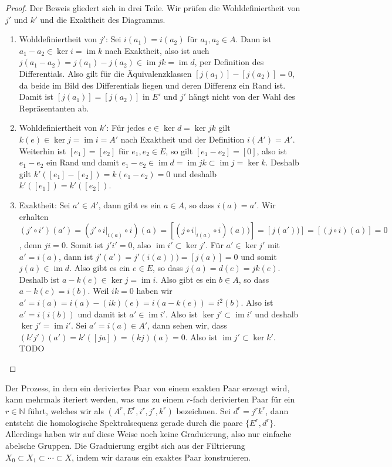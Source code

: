 \documentclass[12pt, hidelinks]{article}
\numberwithin{conj}{section}
\newcommand{\ima}{\operatorname{im}}
\begin{document}
\begin{proof}
    Der Beweis gliedert sich in drei Teile. Wir prüfen die Wohldefiniertheit von $j'$ und $k'$ und die Exaktheit des Diagramms.
    \begin{enumerate}[nolistsep]
        \item Wohldefiniertheit von $j'$: Sei $i(a_1) = i(a_2)$ für $a_1,a_2 \in A$. Dann ist $a_1-a_2 \in \ker i = \ima k$ nach Exaktheit, also ist auch $j(a_1-a_2) = j(a_1)-j(a_2) \in \ima jk = \ima d$, per Definition des Differentials. Also gilt für die Äquivalenzklassen $[j(a_1)]-[j(a_2)] = 0$, da beide im Bild des Differentials liegen und deren Differenz ein Rand ist. Damit ist $[j(a_1)] = [j(a_2)]$ in $E'$ und $j'$ hängt nicht von der Wahl des Repräsentanten ab.
        \item Wohldefiniertheit von $k'$: Für jedes $e \in \ker d = \ker jk$ gilt $k(e) \in \ker j = \ima i = A'$ nach Exaktheit und der Definition $i(A') = A'$. Weiterhin ist $[e_1] = [e_2]$ für $e_1,e_2 \in E$, so gilt $[e_1 - e_2] = [0]$, also ist $e_1-e_2$ ein Rand und damit $e_1 - e_2 \in \ima d = \ima jk \subset \ima j = \ker k$. Deshalb gilt $k'([e_1] - [e_2]) = k(e_1-e_2) = 0$ und deshalb $k'([e_1]) = k'([e_2])$.
        \item Exaktheit: Sei $a' \in A'$, dann gibt es ein $a \in A$, so dass $i(a) = a'$. Wir erhalten $(j'\circ i')(a') = (j'\circ i\vert_{i(a)} \circ i)(a) = [(j \circ i\vert_{i(a)} \circ i)(a))] = [j(a'))] = [(j\circ i)(a)] = 0$, denn $ji = 0$. Somit ist $j'i' = 0$, also $\ima i' \subset \ker j'$. Für $a' \in \ker j'$ mit $a' = i(a)$, dann ist $j'(a') = j'(i(a))) = [j(a)] = 0$ und somit $j(a) \in \ima d$. Also gibt es ein $e \in E$, so dass $j(a) = d(e) = jk(e)$. Deshalb ist $a-k(e) \in \ker j = \ima i$. Also gibt es ein $b \in A$, so dass $a-k(e) = i(b)$. Weil $ik = 0$ haben wir $a' = i(a) = i(a) - (ik)(e) = i(a-k(e)) = i^2(b)$. Also ist $a' = i(i(b))$ und damit ist $a' \in \ima i'$. Also ist $\ker j' \subset \ima i'$ und deshalb $\ker j' = \ima i'$. Sei $a' = i(a) \in A'$, dann sehen wir, dass $(k'j')(a') = k'([ja]) = (kj)(a) = 0$. Also ist $\ima j' \subset \ker k'$. TODO
    \end{enumerate}
\end{proof}

Der Prozess, in dem ein deriviertes Paar von einem exakten Paar erzeugt wird, kann mehrmals iteriert werden, was uns zu einem $r$-fach derivierten Paar für ein $r \in \mathbb{N}$ führt, welches wir als $(A^r, E^r,i^r,j^r,k^r)$ bezeichnen. Sei $d^r = j^r k^r$, dann entsteht die homologische Spektralsequenz gerade durch die paare $\{E^r, d^r\}$. Allerdings haben wir auf diese Weise noch keine Graduierung, also nur einfache abelsche Gruppen. Die Graduierung ergibt sich aus der Filtrierung $X_0 \subset X_1 \subset \cdots \subset X$, indem wir daraus ein exaktes Paar konstruieren.
\end{document}
